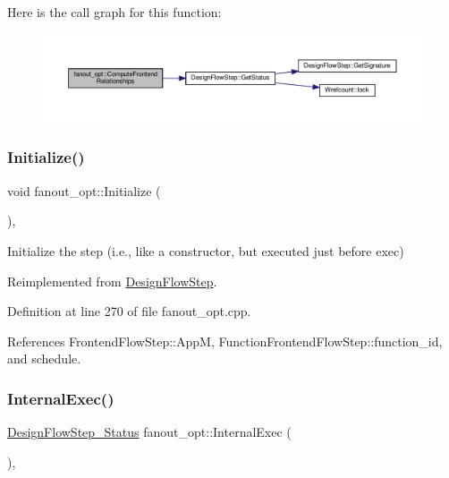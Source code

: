 Here is the call graph for this function\+:
\nopagebreak
\begin{figure}[H]
\begin{center}
\leavevmode
\includegraphics[width=350pt]{dc/df3/classfanout__opt_aa781d3ef037625b718dbc83764bc940f_cgraph}
\end{center}
\end{figure}
\mbox{\label{classfanout__opt_a64ba51ab333ce9c993abcd30bca77119}} 
\subsubsection{\texorpdfstring{Initialize()}{Initialize()}}
{\footnotesize\ttfamily void fanout\+\_\+opt\+::\+Initialize (\begin{DoxyParamCaption}{ }\end{DoxyParamCaption})\hspace{0.3cm}{\ttfamily [override]}, {\ttfamily [virtual]}}



Initialize the step (i.\+e., like a constructor, but executed just before exec) 



Reimplemented from \hyperlink{classDesignFlowStep_a44b50683382a094976e1d432a7784799}{Design\+Flow\+Step}.



Definition at line 270 of file fanout\+\_\+opt.\+cpp.



References Frontend\+Flow\+Step\+::\+AppM, Function\+Frontend\+Flow\+Step\+::function\+\_\+id, and schedule.

\mbox{\label{classfanout__opt_aca7aa64720a8242be9722e2216f57344}} 
\subsubsection{\texorpdfstring{Internal\+Exec()}{InternalExec()}}
{\footnotesize\ttfamily \hyperlink{design__flow__step_8hpp_afb1f0d73069c26076b8d31dbc8ebecdf}{Design\+Flow\+Step\+\_\+\+Status} fanout\+\_\+opt\+::\+Internal\+Exec (\begin{DoxyParamCaption}{ }\end{DoxyParamCaption})\hspace{0.3cm}{\ttfamily [override]}, {\ttfamily [virtual]}}



